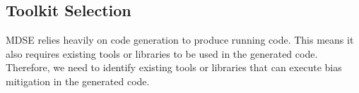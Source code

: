 \documentclass[sigconf,review]{acmart}
\begin{document}

\subsection{Toolkit Selection}
\label{sec:toolkit_selection}
MDSE relies heavily on code generation to produce running code. This means it also requires existing tools or libraries to be used in the generated code. Therefore, we need to identify existing tools or libraries that can execute bias mitigation in the generated code. 
\end{document}
